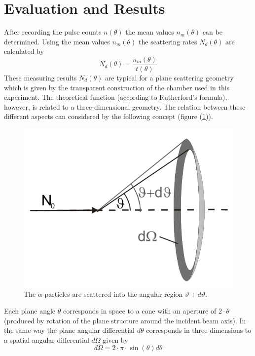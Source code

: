 \documentclass[%
 reprint,
nofootinbib,
 amsmath,amssymb,
 aps,
floatfix,
]{revtex4-2}
\begin{document}
\section{Evaluation and Results}
    After recording the pulse counts $n(\theta)$ the mean values $n_m(\theta)$ can be determined. Using the mean values $n_m(\theta)$ the scattering rates $N_d(\theta)$ are calculated by
    \begin{equation}
        N_d(\theta) = \dfrac{n_m (\theta)}{t(\theta)}
    \end{equation}
    These measuring results $N_d(\theta)$ are typical for a plane scattering geometry which is given by the transparent construction of the chamber used in this experiment. The theoretical function (according to Rutherford’s formula), however, is related to a three-dimensional geometry. The relation between these different aspects can considered by the following concept (figure (\ref{fig:angle})).
    \begin{figure}
        \centering
        \includegraphics[scale = 0.7]{Figures/angular.png}
        \caption{The $\alpha$-particles are scattered into the angular region $\vartheta + d \vartheta$.}
        \label{fig:angle}
    \end{figure}
    \par
    Each plane angle $\theta$ corresponds in space to a cone with an aperture of $2 \cdot \theta$ (produced by rotation of the plane structure around the incident beam axis). In the same way the plane angular differential $d \theta$ corresponds in three dimensions to a spatial angular differential $d \Omega$ given by
    \begin{equation}
        d \Omega = 2 \cdot \pi \cdot \sin (\theta) d\theta 
    \end{equation}
\end{document}
